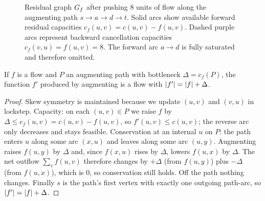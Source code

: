 \begin{figure}[H]
\centering
{}
\caption{Residual graph $G_f$ after pushing $8$ units of flow along the augmenting path $s\to a\to d\to t$. Solid arcs show available forward residual capacities $c_f(u,v)=c(u,v)-f(u,v)$. Dashed purple arcs represent backward cancellation capacities $c_f(v,u)=f(u,v)=8$. The forward arc $a\to d$ is fully saturated and therefore omitted.}
\label{ch12:fig-residual}
\end{figure}

\begin{lemma}
\label{ch12:lem-augment}
If $f$ is a flow and $P$ an augmenting path with bottleneck $\Delta=c_f(P)$, the
function $f'$ produced by augmenting is a flow with $\lvert f'\rvert=\lvert f\rvert+\Delta$.
\end{lemma}

\begin{proof}
Skew symmetry is maintained because we update $(u,v)$ and $(v,u)$ in lockstep.
Capacity: on each $(u,v)\in P$ we raise $f$ by $\Delta\le c_f(u,v)=c(u,v)-f(u,v)$,
so $f'(u,v)\le c(u,v)$; the reverse arc only decreases and stays feasible.
Conservation at an internal $u$ on $P$: the path enters $u$ along some arc
$(x,u)$ and leaves along some arc $(u,y)$. Augmenting raises $f(u,y)$ by $\Delta$
and, since $f(x,u)$ rises by $\Delta$, lowers $f(u,x)$ by $\Delta$. The net
outflow $\sum_v f(u,v)$ therefore changes by $+\Delta$ (from $f(u,y)$) plus
$-\Delta$ (from $f(u,x)$), which is $0$, so conservation still holds. Off the path
nothing changes. Finally $s$ is the path's first vertex with exactly one outgoing
path-arc, so $\lvert f'\rvert=\lvert f\rvert+\Delta$.
\end{proof}

